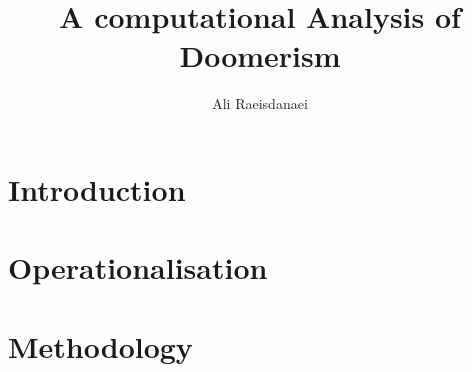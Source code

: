 \documentclass{article}
\begin{document}

\title{A computational Analysis of Doomerism}
\author{Ali Raeisdanaei}
\maketitle

\section{Introduction}


\section{Operationalisation}


\section{Methodology}


\printbibliography
\end{document}
